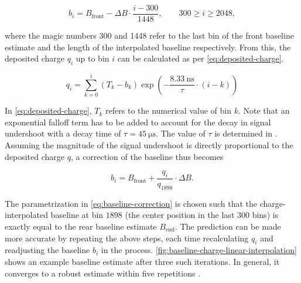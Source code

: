 \begin{itemize}
	\begin{equation}
	\label{eq:baseline-charge-linear-interpolation}
		b_i = B_\text{front} - \Delta B \cdot \frac{i - 300}{1448}, \qquad 300 \geq i \geq 2048,
	\end{equation}	

	where the magic numbers 300 and 1448 refer to the last bin of the front baseline estimate and the length of the interpolated baseline respectively. From 
	this, the deposited charge $q_i$ up to bin $i$ can be calculated as per \autoref{eq:deposited-charge}.

	\begin{equation}
	\label{eq:deposited-charge}
		q_i = \sum_{k = 0}^{i} \left( T_k - b_k \right)\exp\left(-\frac{\SI{8.33}{\nano\second}}{\tau}\cdot(i-k)\right)
	\end{equation}
	
	In \autoref{eq:deposited-charge}, $T_k$ refers to the numerical value of bin $k$. Note that an exponential falloff term has to be added to account for the
	decay in signal undershoot with a decay time of $\tau = \SI{45}{\micro\second}$. The value of $\tau$ is determined in \cite{tobiasBaselineUUB}. Assuming 
	the magnitude of the signal undershoot is directly proportional to the deposited charge $q$, a correction of the baseline thus becomes

	\begin{equation}
	\label{eq:baseline-correction}
		b_i = B_\text{front} + \frac{q_i}{q_{1898}} \cdot \Delta B.
	\end{equation}
	
	The parametrization in \autoref{eq:baseline-correction} is chosen such that the charge-interpolated baseline at bin $1898$ (the center position in the last
	$300$ bins) is exactly equal to the rear baseline estimate $B_\text{end}$. The prediction can be made more accurate by repeating the above steps, each time
	recalculating $q_i$ and readjusting the baseline $b_i$ in the process. \autoref{fig:baseline-charge-linear-interpolation} shows an example baseline 
	estimate after three such iterations. In general, it converges to a robust estimate within five repetitions \cite{tobiasBaselineUUB}.

\end{itemize}

